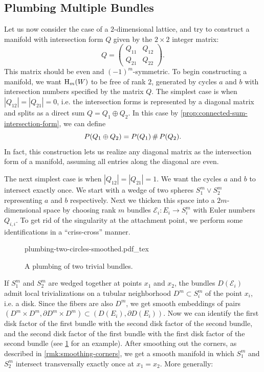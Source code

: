 \subsection{Plumbing Multiple Bundles}

Let us now consider the case of a $2$-dimensional lattice, and try to construct a manifold with intersection form $Q$ given by the $2\times 2$ integer matrix:
\[
	Q = \begin{pmatrix} Q_{11} & Q_{12} \\ Q_{21} & Q_{22}\end{pmatrix}.
\]
This matrix should be even and $(-1)^m$-symmetric. To begin constructing a manifold, we want $\operatorname{H}_m(W)$ to be free of rank $2$, generated by cycles $a$ and $b$ with intersection numbers specified by the matrix $Q$.
The simplest case is when $|Q_{12}|=|Q_{21}|=0$, i.e. the intersection forms is represented by a diagonal matrix and splits as a direct sum $Q=Q_1\oplus Q_2$. In this case by \cref{prop:connected-sum-intersection-form}, we can define
\[
	P(Q_1\oplus Q_2) = P(Q_1)\+ P(Q_2).
\]
In fact, this construction lets us realize any diagonal matrix as the intersection form of a manifold, assuming all entries along the diagonal are even.

The next simplest case is when $|Q_{12}|=|Q_{21}|=1$. We want the cycles $a$ and $b$ to intersect exactly once. We start with a wedge of two spheres $S^m_1\vee S^m_2$ representing $a$ and $b$ respectively. Next we thicken this space into a $2m$-dimensional space by choosing rank $m$ bundles $\mathcal{E}_i : E_i \to S^m_i$ with Euler numbers $Q_{i,i}$. To get rid of the singularity at the attachment point, we perform some identifications in a ``criss-cross'' manner.

\begin{figure}[ht]
	\centering
	{plumbing-two-circles-smoothed.pdf_tex}
	\caption{A plumbing of two trivial bundles.}\label{fig:plumbing-two-circles}
\end{figure}

If $S^m_1$ and $S^m_2$ are wedged together at points $x_1$ and $x_2$,
the bundles $D(\mathcal{E}_i)$ admit local trivializations on a tubular neighborhood $D^m \subset S^m_i$ of the point $x_i$, i.e. a disk.
Since the fibers are also $D^m$, we get smooth embeddings of pairs $(D^m\times D^m, \partial D^m\times D^m)\subset (D(E_i),\partial D(E_i))$.
Now we can identify the first disk factor of the first bundle with the second disk factor of the second bundle, and the second disk factor of the first bundle with the first disk factor of the second bundle (see \cref{fig:plumbing-two-circles} for an example). After smoothing out the corners, as described in \cref{rmk:smoothing-corners}, we get a smooth manifold in which $S_1^m$ and $S_2^m$ intersect transversally exactly once at $x_1=x_2$. More generally:

